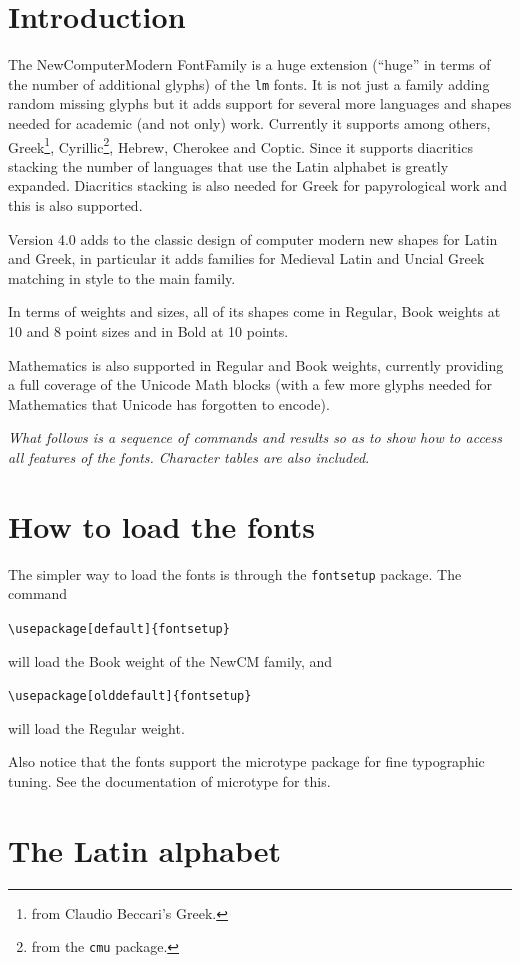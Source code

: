 \documentclass{article}
\begin{document}
\section{Introduction}
The NewComputerModern FontFamily is a huge extension (``huge'' in terms of
the number of additional glyphs)
of the \verb|lm| fonts. It is not just a family adding random missing glyphs but it
adds support for several more languages and shapes needed for academic (and not only) work.
Currently it supports among others, Greek\footnote{from Claudio Beccari's Greek.},
Cyrillic\footnote{from the \texttt{cmu} package.}, Hebrew, Cherokee and
Coptic. Since it supports
diacritics stacking the number of languages that use the Latin alphabet is greatly expanded. 
Diacritics stacking is also needed for Greek for papyrological work and this is also supported.

Version 4.0 adds to the classic design of computer modern new shapes for Latin and Greek,
in particular it adds families for Medieval Latin and Uncial Greek matching in style to the
main family.

In terms of weights and sizes, all of its shapes come in Regular, Book weights
at 10 and 8 point sizes and in Bold at 10 points.

Mathematics is also supported in Regular and Book weights, currently providing
a full coverage of the Unicode Math blocks (with a few more glyphs needed for Mathematics
that Unicode has forgotten to encode).

\textit{What follows is a sequence of commands and results so as to show how to access all features
of the fonts. Character tables are also included}.


\section{How to load the fonts}
The simpler way to load the fonts is through the \verb|fontsetup| package. The command

\verb|\usepackage[default]{fontsetup}|

\noindent will load the Book weight of the NewCM family, and

\verb|\usepackage[olddefault]{fontsetup}|

\noindent will load the Regular weight.

Also notice that the fonts support the microtype package for fine typographic tuning. See the
documentation of microtype for this.

\section{The Latin alphabet}
\end{document}

